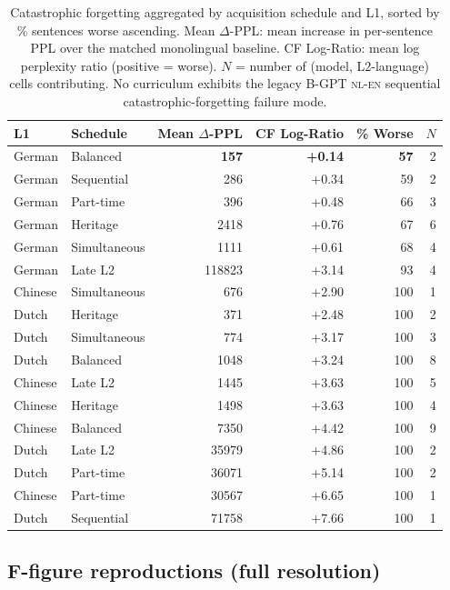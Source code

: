\begin{table}[t]
  \centering
  \small
  \caption{Catastrophic forgetting aggregated by acquisition schedule and L1, sorted by \% sentences worse ascending. Mean $\Delta$-PPL: mean increase in per-sentence PPL over the matched monolingual baseline. CF Log-Ratio: mean log perplexity ratio (positive = worse). $N$ = number of (model, L2-language) cells contributing. No \beetle{} curriculum exhibits the legacy B-GPT \textsc{nl-en} sequential catastrophic-forgetting failure mode.}
  \label{tab:forgetting}
  \begin{tabular}{llrrrr}
    \toprule
    L1 & Schedule & Mean $\Delta$-PPL & CF Log-Ratio & \% Worse & $N$ \\
    \midrule
    German  & Balanced     & \textbf{157} & \textbf{+0.14} & \textbf{57} & 2 \\
    German  & Sequential   & 286   & +0.34 & 59  & 2 \\
    German  & Part-time    & 396   & +0.48 & 66  & 3 \\
    German  & Heritage     & 2418  & +0.76 & 67  & 6 \\
    German  & Simultaneous & 1111  & +0.61 & 68  & 4 \\
    German  & Late L2      & 118823 & +3.14 & 93 & 4 \\
    Chinese & Simultaneous & 676   & +2.90 & 100 & 1 \\
    Dutch   & Heritage     & 371   & +2.48 & 100 & 2 \\
    Dutch   & Simultaneous & 774   & +3.17 & 100 & 3 \\
    Dutch   & Balanced     & 1048  & +3.24 & 100 & 8 \\
    Chinese & Late L2      & 1445  & +3.63 & 100 & 5 \\
    Chinese & Heritage     & 1498  & +3.63 & 100 & 4 \\
    Chinese & Balanced     & 7350  & +4.42 & 100 & 9 \\
    Dutch   & Late L2      & 35979 & +4.86 & 100 & 2 \\
    Dutch   & Part-time    & 36071 & +5.14 & 100 & 2 \\
    Chinese & Part-time    & 30567 & +6.65 & 100 & 1 \\
    Dutch   & Sequential   & 71758 & +7.66 & 100 & 1 \\
    \bottomrule
  \end{tabular}
\end{table}

\subsection{F-figure reproductions (full resolution)}


